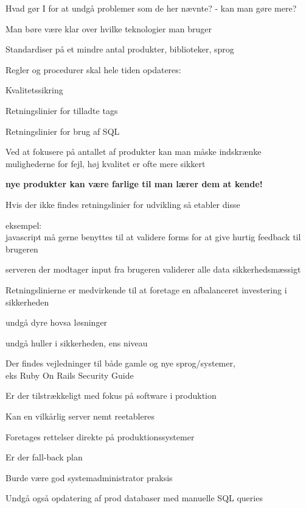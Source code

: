 \documentclass[20pt,landscape,a4paper,footrule]{foils}
\begin{document}
\begin{list1}
\item Hvad gør I for at undgå problemer som de her nævnte?
- kan man gøre mere?
\item Man børe være klar over hvilke teknologier man bruger
\item Standardiser på et mindre antal produkter, biblioteker, sprog
\item Regler og procedurer skal hele tiden opdateres:
\begin{list2}
\item Kvalitetssikring
\item Retningslinier for tilladte tags
\item Retningslinier for brug af SQL
\end{list2}

\item Ved at fokusere på antallet af produkter kan man måske
  indskrænke mulighederne for fejl, høj kvalitet er ofte mere sikkert

\item {\bf nye produkter kan være farlige til man lærer dem at kende!}
\end{list1}


\begin{list2}
\item Hvis der ikke findes retningslinier for udvikling så etabler disse
\item eksempel:\\
javascript må gerne benyttes til at validere forms for at give hurtig
feedback til brugeren
\item serveren der modtager input fra brugeren validerer alle data
  sikkerhedsmæssigt
\item Retningslinierne er medvirkende til at foretage
en afbalanceret investering i sikkerheden
\item undgå dyre hovsa løsninger
\item undgå huller i sikkerheden, ens niveau

\item Der findes vejledninger til både gamle og nye sprog/systemer, \\
eks Ruby On Rails Security Guide
\end{list2}




\begin{list1}
\item Er der tilstrækkeligt med fokus på software i produktion
\item Kan en vilkårlig server nemt reetableres
\item Foretages rettelser direkte på produktionssystemer
\item Er der fall-back plan
\item Burde være god systemadministrator praksis
\vskip 2cm
\item Undgå også opdatering af prod databaser med manuelle SQL queries
\end{list1}
\end{document}
